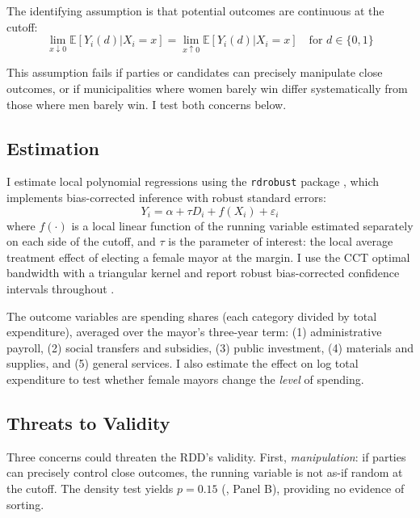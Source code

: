 \documentclass[12pt]{article}
\newcommand{\E}{\mathbb{E}}
\begin{document}
The identifying assumption is that potential outcomes are continuous at the cutoff:
\begin{equation}
\lim_{x \downarrow 0} \E[Y_i(d) | X_i = x] = \lim_{x \uparrow 0} \E[Y_i(d) | X_i = x] \quad \text{for } d \in \{0,1\}
\end{equation}

This assumption fails if parties or candidates can precisely manipulate close outcomes, or if municipalities where women barely win differ systematically from those where men barely win. I test both concerns below.

\subsection{Estimation}

I estimate local polynomial regressions using the \texttt{rdrobust} package \citep{cattaneo2020}, which implements bias-corrected inference with robust standard errors:
\begin{equation}
Y_i = \alpha + \tau D_i + f(X_i) + \varepsilon_i
\end{equation}
where $f(\cdot)$ is a local linear function of the running variable estimated separately on each side of the cutoff, and $\tau$ is the parameter of interest: the local average treatment effect of electing a female mayor at the margin. I use the CCT optimal bandwidth with a triangular kernel and report robust bias-corrected confidence intervals throughout \citep{calonico2014}.

The outcome variables are spending shares (each category divided by total expenditure), averaged over the mayor's three-year term: (1) administrative payroll, (2) social transfers and subsidies, (3) public investment, (4) materials and supplies, and (5) general services. I also estimate the effect on log total expenditure to test whether female mayors change the \textit{level} of spending.

\subsection{Threats to Validity}



Three concerns could threaten the RDD's validity. First, \textit{manipulation}: if parties can precisely control close outcomes, the running variable is not as-if random at the cutoff. The \citet{cattaneo2020density} density test yields $p = 0.15$ (, Panel B), providing no evidence of sorting.
\end{document}
